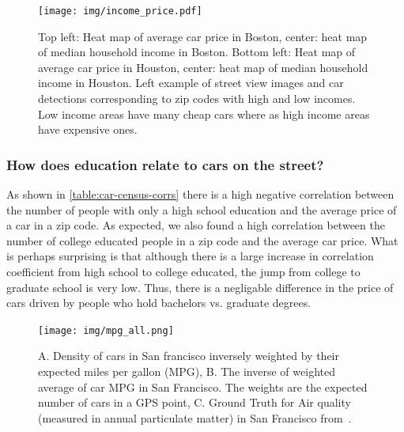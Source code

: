 \documentclass[10pt,twocolumn,letterpaper]{article}
\begin{document}
\begin{figure}[t]
\begin{center}
    \texttt{[image: img/income\_price.pdf]}
\end{center}
   \caption {Top left: Heat map of average car price in Boston, center: heat map of median household income in Boston. Bottom left: Heat map of average car price in Houston, center: heat map of median household income in Houston. Left example of street view images and car detections corresponding to zip codes with high and low incomes. Low income areas have many cheap cars where as high income areas have expensive ones.}
\label{fig:bos-sf-vis}
\end{figure}

\subsubsection{How does education relate to cars on the street?}
As shown in \ref{table:car-census-corrs} there is a high negative correlation between the number of people with only a high school education and the average price of a car in a zip code. As expected, we also found a high correlation between the number of college educated people in a zip code and the average car price. What is perhaps surprising is that although there is a large increase in correlation coefficient from high school to college educated, the jump from college to graduate school is very low. Thus, there is a negligable difference in the price of cars driven by people who hold bachelors vs. graduate degrees.

\begin{figure}[t]
\begin{center}
    \texttt{[image: img/mpg\_all.png]}
\end{center}
   \caption {A. Density of cars in San francisco inversely weighted by their expected miles per gallon (MPG), B. The inverse of weighted average of car MPG in San Francisco. The weights are the expected number of cars in a GPS point, C. Ground Truth for Air quality (measured in annual particulate matter) in San Francisco from~\cite{ground_air}.}
\label{fig:pollution}
\end{figure}
\end{document}
